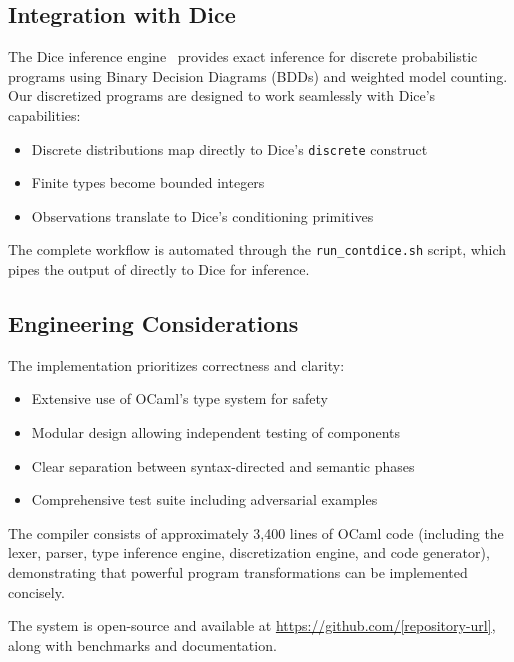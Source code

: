 \subsection{Integration with Dice}

The Dice inference engine~\cite{Holtzen2020Dice} provides exact inference for discrete probabilistic programs using Binary Decision Diagrams (BDDs) and weighted model counting. Our discretized programs are designed to work seamlessly with Dice's capabilities:
\begin{itemize}
    \item Discrete distributions map directly to Dice's \texttt{discrete} construct
    \item Finite types become bounded integers
    \item Observations translate to Dice's conditioning primitives
\end{itemize}

The complete workflow is automated through the \texttt{run\_contdice.sh} script, which pipes the output of \Slice{} directly to Dice for inference.

\subsection{Engineering Considerations}

The implementation prioritizes correctness and clarity:
\begin{itemize}
    \item Extensive use of OCaml's type system for safety
    \item Modular design allowing independent testing of components
    \item Clear separation between syntax-directed and semantic phases
    \item Comprehensive test suite including adversarial examples
\end{itemize}

The \Slice{} compiler consists of approximately 3,400 lines of OCaml code (including the lexer, parser, type inference engine, discretization engine, and code generator), demonstrating that powerful program transformations can be implemented concisely.

The system is open-source and available at \url{https://github.com/[repository-url]}, along with benchmarks and documentation.



